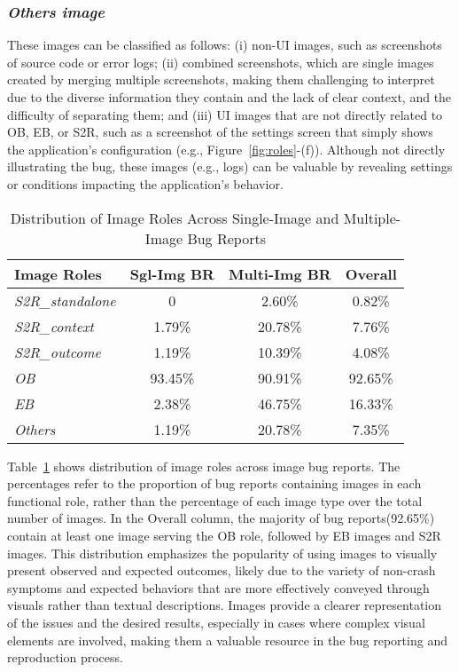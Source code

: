 \subsubsection{
\textbf{\textit{Others image}}} 
These images can be classified as follows: (i) non-UI images, such as screenshots of source code or error logs; (ii) combined screenshots, which are single images created by merging multiple screenshots, making them challenging to interpret due to the diverse information they contain and the lack of clear context, and the difficulty of separating them; and (iii) UI images that are not directly related to OB, EB, or S2R, such as a screenshot of the settings screen that simply shows the application's configuration (e.g., Figure~\ref{fig:roles}-(f)).
%
Although not directly illustrating the bug, these images (e.g., logs) can be valuable by revealing settings or conditions impacting the application’s behavior.




\begin{table}[h]
\centering
\caption{Distribution of Image Roles Across Single-Image and Multiple-Image Bug Reports}
\label{tab:rq2}
\small
\begin{tabular}{|l|c|c|c|}
\hline
 \rowcolor{gray!45}     Image Roles       & Sgl-Img BR & Multi-Img BR &  \textbf{Overall}\\ \hline\hline
 
\textit{S2R\_standalone}   & 0  & 2.60\% &  0.82\%\\ \hline
\textit{S2R\_context}   & 1.79\%  &  20.78\%  &   7.76\%\\ \hline
\textit{S2R\_outcome}   & 1.19\%  & 10.39\% &  4.08\% \\ \hline
\textit{OB}  &  93.45\% &  90.91\% & 92.65\% \\ \hline
\textit{EB}  &  2.38\%  &  46.75\% & 16.33\% \\ \hline
\textit{Others}   & 1.19\%  & 20.78\% & 7.35\% \\ \hline


\end{tabular}
\vspace{-10pt}
\end{table}


Table~\ref{tab:rq2} shows distribution of image roles
across image bug reports. The percentages refer to the proportion of bug reports containing images in each functional role, rather than the percentage of each image type over the total number of images.
%
In the Overall column, the majority of bug reports(92.65\%) contain at least one image serving the OB role, followed by EB images and S2R images. This distribution emphasizes the popularity of using images to visually present observed and expected outcomes, likely due to the variety of non-crash symptoms and expected behaviors that are more effectively conveyed through visuals rather than textual descriptions. Images provide a clearer representation of the issues and the desired results, especially in cases where complex visual elements are involved, making them a valuable resource in the bug reporting and reproduction process.

